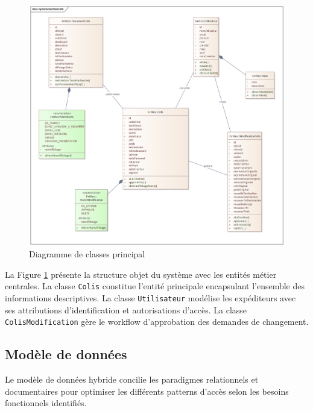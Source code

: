 \begin{figure}[H]
\centering
\includegraphics[width=1.1\textwidth]{images/class_diagram.png}
\caption{Diagramme de classes principal}
\label{fig:class_diagram}
\end{figure}

La Figure \ref{fig:class_diagram} présente la structure objet du système avec les entités métier centrales. La classe \texttt{Colis} constitue l'entité principale encapsulant l'ensemble des informations descriptives. La classe \texttt{Utilisateur} modélise les expéditeurs avec ses attributions d'identification et autorisations d'accès. La classe \texttt{ColisModification} gère le workflow d'approbation des demandes de changement.
\newpage
\subsection{Modèle de données}

Le modèle de données hybride concilie les paradigmes relationnels et documentaires pour optimiser les différents patterns d'accès selon les besoins fonctionnels identifiés.

